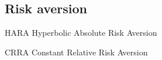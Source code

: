 
\subsection{Risk aversion}

HARA Hyperbolic Absolute Risk Aversion

CRRA Constant Relative Risk Aversion


